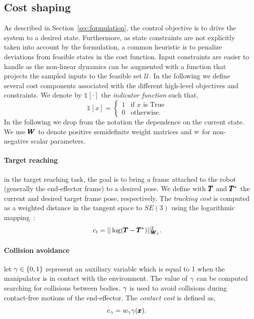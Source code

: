 \subsection{Cost shaping}
As described in Section~\ref{sec:formulation}, the control objective is to drive the system to a desired state. Furthermore, as state constraints are not explicitly taken into account by the formulation, a common heuristic is to penalize deviations from feasible states in the cost function. Input constraints are easier to handle as the non-linear dynamics can be augmented with a function that projects the sampled inputs to the feasible set $\mathcal{U}$. In the following we define several cost components associated with the different high-level objectives and constraints.
We denote by $\mathds{1}[\cdot]$ the \textit{indicator function} such that,
\begin{equation}
    \mathds{1}[x] = 
    \begin{cases}
    1 & \text{if } x \text{ is True} \\
    0 & \text{otherwise}.
    \end{cases}
\end{equation}
In the following we drop from the notation the dependence on the current state. We use $\pmb{W}_{}$ to denote positive semidefinite weight matrices and $w_{}$ for non-negative scalar parameters. 

\paragraph{Target reaching} in the target reaching task, the goal is to bring a frame attached to the robot (generally the end-effector frame) to a desired pose. We define with $\pmb{T}$ and $\pmb{T}^*$ the current and desired target frame pose, respectively. The \textit{tracking cost} is computed as a weighted distance in the tangent space to $SE(3)$ using the logarithmic mapping~\cite{blanco2010tutorial}:
\begin{equation} \label{eq:tracking_cost}
     c_{t} = || \log(\pmb{T} - \pmb{T}^{*}) ||^2_{\pmb{W}_{t}}.
 \end{equation}
 
 \paragraph{Collision avoidance} let $\gamma \in \{0, 1\}$ represent an auxiliary variable which is equal to 1 when the manipulator is in contact with the environment. The value of $\gamma$ can be computed searching for collisions between bodies. 
 $\gamma$ is used to avoid collisions during contact-free motions of the end-effector. 
 The \textit{contact cost} is defined as,
 \begin{equation}
     c_{\gamma}= w_{\gamma} \gamma(\pmb{x}).
 \end{equation}

